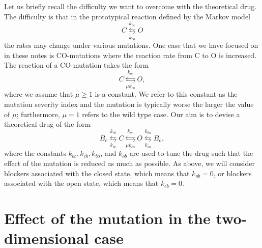 {Let us briefly recall the difficulty we want to overcome with the
theoretical drug. The difficulty is that in the prototypical reaction
defined by the Markov model
\[
C\underset{k_{co}}{\overset{k_{oc}}{\leftrightarrows}}O
\]
the rates may change under various mutations. One case that we have focused on 
in these notes is CO-mutations where the reaction rate from C to O is increased.
The reaction of a CO-mutation takes the form
\[
C\underset{ \mu k_{co}}{\overset{k_{oc}}{\leftrightarrows}}O,
\]
where we assume that $\mu\geqslant1$ is a constant. We refer to this constant
as the mutation severity index and the mutation is typically worse the larger
the value of $\mu$; furthermore, $\mu=1$ refers to the wild type case.
Our aim is to devise a theoretical drug of the form 
\[
B_c\underset{k_{bc}}{\overset{k_{cb}}{\leftrightarrows}}C\underset{\mu k_{co}
}{\overset{k_{oc}}{\leftrightarrows}}O\underset{k_{ob}}{\overset{k_{bo}}{\leftrightarrows}}B_o,
\]
where the constants $k_{bc}, k_{cb}, k_{bo}$, and $k_{ob}$ are used to tune the drug such 
that the effect of the mutation is reduced as much as possible. As above, we will consider blockers associated with
the closed state, which means that $k_{ob}=0$, or blockers associated with the open state, which means that $k_{cb}=0$.



\section[Effect of the mutation in 2D]{Effect of the mutation in the two-dimensional case}

}
